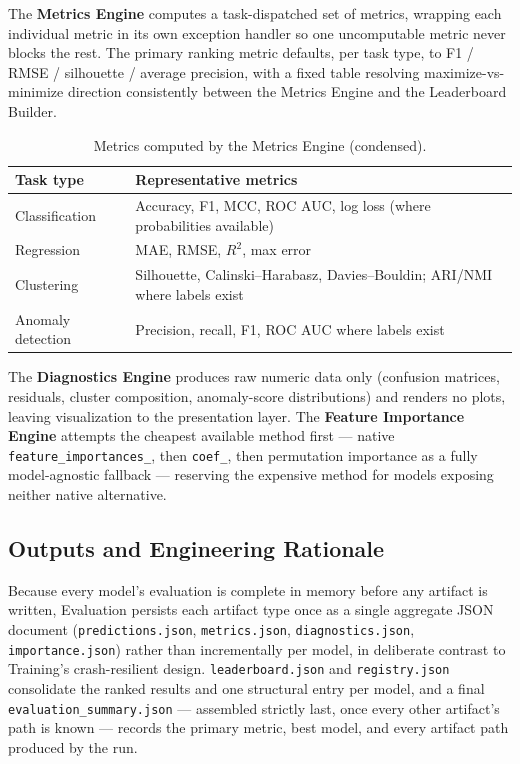 The \textbf{Metrics Engine} computes a task-dispatched set of metrics, wrapping each individual metric in its own exception handler so one uncomputable metric never blocks the rest. The primary ranking metric defaults, per task type, to F1 / RMSE / silhouette / average precision, with a fixed table resolving maximize-vs-minimize direction consistently between the Metrics Engine and the Leaderboard Builder.

\begin{table}[H]
\centering
\begin{tabularx}{\textwidth}{l X}
\toprule
\textbf{Task type} & \textbf{Representative metrics} \\
\midrule
Classification & Accuracy, F1, MCC, ROC AUC, log loss (where probabilities available) \\
Regression & MAE, RMSE, $R^2$, max error \\
Clustering & Silhouette, Calinski--Harabasz, Davies--Bouldin; ARI/NMI where labels exist \\
Anomaly detection & Precision, recall, F1, ROC AUC where labels exist \\
\bottomrule
\end{tabularx}
\caption{Metrics computed by the Metrics Engine (condensed).}
\label{tab:eval-metrics-brief}
\end{table}

The \textbf{Diagnostics Engine} produces raw numeric data only (confusion matrices, residuals, cluster composition, anomaly-score distributions) and renders no plots, leaving visualization to the presentation layer. The \textbf{Feature Importance Engine} attempts the cheapest available method first --- native \texttt{feature\_importances\_}, then \texttt{coef\_}, then permutation importance as a fully model-agnostic fallback --- reserving the expensive method for models exposing neither native alternative.

\subsection{Outputs and Engineering Rationale}
\label{subsec:evaluation-outputs}

Because every model's evaluation is complete in memory before any artifact is written, Evaluation persists each artifact type once as a single aggregate JSON document (\texttt{predictions.json}, \texttt{metrics.json}, \texttt{diagnostics.json}, \texttt{importance.json}) rather than incrementally per model, in deliberate contrast to Training's crash-resilient design. \texttt{leaderboard.json} and \texttt{registry.json} consolidate the ranked results and one structural entry per model, and a final \texttt{evaluation\_summary.json} --- assembled strictly last, once every other artifact's path is known --- records the primary metric, best model, and every artifact path produced by the run.

